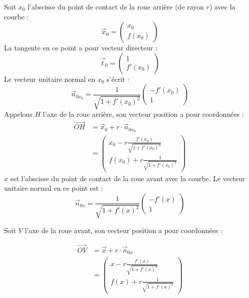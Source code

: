 \documentclass[11pt,english,BCOR=10mm,DIV=12,bibliography=totoc,parskip=false,headings=small,
    headinclude=false,footinclude=false,oneside]{pst-doc}
\begin{document}
Soit $x_0$ l'abscisse du point de contact de la roue arrière (de rayon $r$) avec la courbe :
\begin{equation*}
\vec{x}_0=
\begin{pmatrix}
x_0\\
f(x_0)
\end{pmatrix}
\end{equation*}
La tangente en ce point a pour vecteur directeur :
\begin{equation*}
\vec{t}_0=
\begin{pmatrix}
1\\
f'(x_0)
\end{pmatrix}
\end{equation*}
Le vecteur unitaire normal en $x_0$ s'écrit :
\begin{equation*}
\vec{n}_{0x_0}=\frac{1}{\sqrt{1+f'(x_0)^2}}
\begin{pmatrix}
-f'(x_0)\\
1
\end{pmatrix}
\end{equation*}
Appelons $H$ l'axe de la roue arrière, son vecteur position a pour coordonnées :
\begin{align*}
\overrightarrow{OH}&=\vec{x}_0+r\cdot \vec{n}_{0x_0}\\
&=\begin{pmatrix}
x_0-r\frac{f'(x_0)}{\sqrt{1+f'(x_0)^2}}\\
f(x_0)+r\frac{1}{\sqrt{1+f'(x_0)^2}}
\end{pmatrix}
\end{align*}
$x$ est l'abscisse du point de contact de la roue avant avec la courbe.
Le vecteur unitaire normal en ce point est :
\begin{equation*}
\vec{n}_{0x}=\frac{1}{\sqrt{1+f'(x)^2}}
\begin{pmatrix}-f'(x)\\1\end{pmatrix}
\end{equation*}

Soit $V$ l'axe de la roue avant, son vecteur position a pour coordonnées :

\begin{align*}
\overrightarrow{OV} &= \vec{x}+r\cdot \vec{n}_{0x}\\
                    &=\begin{pmatrix} x-r\frac{f'(x)}{\sqrt{1+f'(x)^2}}\\
                          f(x)+r\frac{1}{\sqrt{1+f'(x)^2}}
                      \end{pmatrix}
\end{align*}
\end{document}
